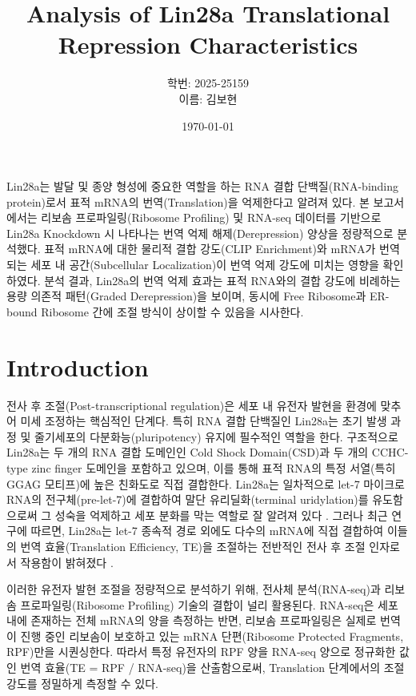 \documentclass[11pt, a4paper]{article}
\title{\textbf{Analysis of Lin28a Translational Repression Characteristics}}
\author{학번: 2025-25159 \\ 이름: 김보현}
\date{\today}
\renewenvironment{abstract}{%
  \begin{center}%
    {\Large\bfseries \abstractname\vspace{-0.5em}\vspace{\z}}%
  \end{center}%
  \quotation
  \normalsize
}{%
  \endquotation
}
\begin{document}
\maketitle

\begin{abstract}
Lin28a는 발달 및 종양 형성에 중요한 역할을 하는 RNA 결합 단백질(RNA-binding protein)로서 표적 mRNA의 번역(Translation)을 억제한다고 알려져 있다. 본 보고서에서는 리보솜 프로파일링(Ribosome Profiling) 및 RNA-seq 데이터를 기반으로 Lin28a Knockdown 시 나타나는 번역 억제 해제(Derepression) 양상을 정량적으로 분석했다. 표적 mRNA에 대한 물리적 결합 강도(CLIP Enrichment)와 mRNA가 번역되는 세포 내 공간(Subcellular Localization)이 번역 억제 강도에 미치는 영향을 확인하였다. 분석 결과, Lin28a의 번역 억제 효과는 표적 RNA와의 결합 강도에 비례하는 용량 의존적 패턴(Graded Derepression)을 보이며, 동시에 Free Ribosome과 ER-bound Ribosome 간에 조절 방식이 상이할 수 있음을 시사한다.
\end{abstract}

\section{Introduction}
전사 후 조절(Post-transcriptional regulation)은 세포 내 유전자 발현을 환경에 맞추어 미세 조정하는 핵심적인 단계다. 특히 RNA 결합 단백질인 Lin28a는 초기 발생 과정 및 줄기세포의 다분화능(pluripotency) 유지에 필수적인 역할을 한다. 구조적으로 Lin28a는 두 개의 RNA 결합 도메인인 Cold Shock Domain(CSD)과 두 개의 CCHC-type zinc finger 도메인을 포함하고 있으며, 이를 통해 표적 RNA의 특정 서열(특히 GGAG 모티프)에 높은 친화도로 직접 결합한다. Lin28a는 일차적으로 let-7 마이크로RNA의 전구체(pre-let-7)에 결합하여 말단 유리딜화(terminal uridylation)를 유도함으로써 그 성숙을 억제하고 세포 분화를 막는 역할로 잘 알려져 있다 \cite{heo2008}. 그러나 최근 연구에 따르면, Lin28a는 let-7 종속적 경로 외에도 다수의 mRNA에 직접 결합하여 이들의 번역 효율(Translation Efficiency, TE)을 조절하는 전반적인 전사 후 조절 인자로서 작용함이 밝혀졌다 \cite{hu2024}.

이러한 유전자 발현 조절을 정량적으로 분석하기 위해, 전사체 분석(RNA-seq)과 리보솜 프로파일링(Ribosome Profiling) 기술의 결합이 널리 활용된다. RNA-seq은 세포 내에 존재하는 전체 mRNA의 양을 측정하는 반면, 리보솜 프로파일링은 실제로 번역이 진행 중인 리보솜이 보호하고 있는 mRNA 단편(Ribosome Protected Fragments, RPF)만을 시퀀싱한다. 따라서 특정 유전자의 RPF 양을 RNA-seq 양으로 정규화한 값인 번역 효율(TE = RPF / RNA-seq)을 산출함으로써, Translation 단계에서의 조절 강도를 정밀하게 측정할 수 있다.
\end{document}
